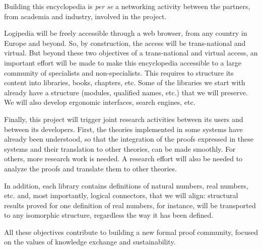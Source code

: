 Building this encyclopedia is {\em per se} a networking activity
between the partners, from academia and industry, involved in the
project.

Logipedia will be freely accessible through a web browser, from any
country in Europe and beyond. So, by construction, the access will be
trans-national and virtual. But beyond these two objectives of a
trans-national and virtual access, an important effort will be made to
make this encyclopedia accessible to a large community of specialists
and non-specialists. This requires to structure its content into
libraries, books, chapters, etc. Some of the libraries we start with
already have a structure (modules, qualified names, etc.) that we will
preserve. We will also develop ergonomic interfaces, search engines,
etc.

Finally, this project will trigger joint research activities between
its users and between its developers.  First, the theories implemented
in some systems have already been understood, so that the integration
of the proofs expressed in these systems and their translation to
other theories, can be made smoothly. For others, more research work
is needed. A research effort will also be needed to analyze the proofs and
translate them to other theories. 

In addition, each library contains definitions of natural numbers,
real numbers, etc. and, most importantly, logical connectors, that
we will align: structural results proved for one definition of real
numbers, for instance, will be transported to any isomorphic structure, 
regardless the way it has been defined.

All these objectives contribute to building a new formal proof
community, focused on the values of knowledge exchange and
sustainability.


